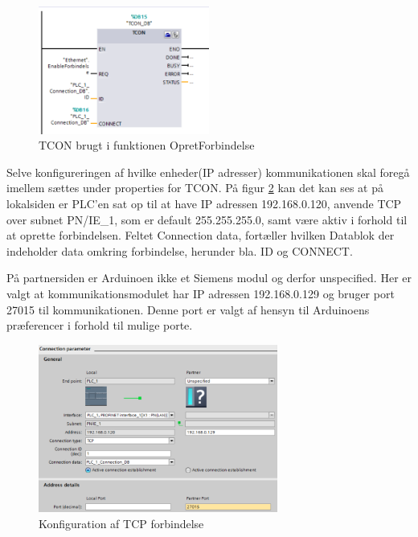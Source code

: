 \begin{figure}[H] %
	\centering
	\includegraphics[width=0.5\textwidth]{Figure/TCON}
	\caption{TCON brugt i funktionen OpretForbindelse}
	\label{fig:TCON}
\end{figure}

Selve konfigureringen af hvilke enheder(IP adresser) kommunikationen skal foregå imellem sættes under properties for TCON. På figur \ref{fig:Konfiguration} kan det kan ses at på lokalsiden er PLC'en sat op til at have IP adressen 192.168.0.120, anvende TCP over subnet PN/IE\_1, som er default 255.255.255.0, samt være aktiv i forhold til at oprette forbindelsen. Feltet Connection data, fortæller hvilken Datablok der indeholder data omkring forbindelse, herunder bla. ID og CONNECT.

På partnersiden er Arduinoen ikke et Siemens modul og derfor unspecified. Her er valgt at kommunikationsmodulet har IP adressen 192.168.0.129 og bruger port 27015 til kommunikationen. Denne port er valgt af hensyn til Arduinoens præferencer i forhold til mulige porte.

\begin{figure}[H] %
	\centering
	\includegraphics[width=0.7\textwidth]{Figure/KonfigurationAfTCPforbindelse}
	\caption{Konfiguration af TCP forbindelse}
	\label{fig:Konfiguration}
\end{figure}

